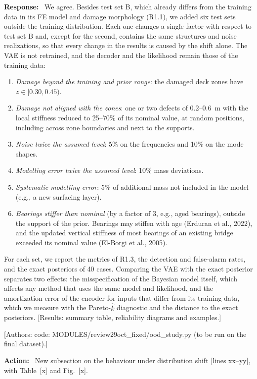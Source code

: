 \documentclass[11pt]{article}
\newenvironment{response}{\par\smallskip\noindent\color{resp}\textbf{Response:}\ }{\par}
\newenvironment{action}{\par\smallskip\noindent\color{resp}\textbf{Action:}\ }{\par}
\newcommand{\authornote}[1]{\textcolor{note}{\textsf{[Authors: #1]}}}
\newcommand{\tbd}[1]{\textcolor{note}{\textsf{[#1]}}}
\newcommand{\lines}[1]{\tbd{lines #1}}
\begin{document}
\begin{response}
We agree. Besides test set B, which already differs from the training data in its FE model and damage morphology (R1.1),
we added six test sets outside the training distribution. Each one changes a single factor with respect to test set B
and, except for the second, contains the same structures and noise realizations, so that every change in the results is
caused by the shift alone. The VAE is not retrained, and the decoder and the likelihood remain those of the training
data:
\begin{enumerate}[leftmargin=*]
\item \emph{Damage beyond the training and prior range}: the damaged deck zones have $z\in[0.30,0.45)$.
\item \emph{Damage not aligned with the zones}: one or two defects of 0.2--0.6~m with the local stiffness reduced to
25--70\% of its nominal value, at random positions, including across zone boundaries and next to the supports.
\item \emph{Noise twice the assumed level}: 5\% on the frequencies and 10\% on the mode shapes.
\item \emph{Modelling error twice the assumed level}: 10\% mass deviations.
\item \emph{Systematic modelling error}: 5\% of additional mass not included in the model (e.g., a new surfacing layer).
\item \emph{Bearings stiffer than nominal} (by a factor of 3, e.g., aged bearings), outside the support of
the prior. Bearings may stiffen with age (Erduran et al., 2022), and the updated vertical stiffness of most bearings of
an existing bridge exceeded its nominal value (El-Borgi et al., 2005).
\end{enumerate}
For each set, we report the metrics of R1.3, the detection and false-alarm rates, and the exact posteriors of 40 cases.
Comparing the VAE with the exact posterior separates two effects: the misspecification of the Bayesian model itself,
which affects any method that uses the same model and likelihood, and the amortization error of the encoder for inputs
that differ from its training data, which we measure with the Pareto-$\hat{k}$ diagnostic and the distance to the exact
posteriors.
\tbd{Results: summary table, reliability diagrams and examples.}
\end{response}
\authornote{code: MODULES/review29oct\_fixed/ood\_study.py (to be run on the final dataset).}

\begin{action}
New subsection on the behaviour under distribution shift \lines{xx--yy}, with Table~\tbd{x} and Fig.~\tbd{x}.
\end{action}
\end{document}
